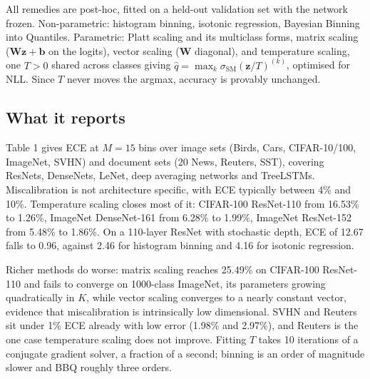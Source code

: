 All remedies are post-hoc, fitted on a held-out validation set with the network frozen. Non-parametric: histogram binning, isotonic regression, Bayesian Binning into Quantiles. Parametric: Platt scaling and its multiclass forms, matrix scaling ($\mathbf{Wz}+\mathbf{b}$ on the logits), vector scaling ($\mathbf{W}$ diagonal), and temperature scaling, one $T>0$ shared across classes giving $\hat{q}=\max_k \sigma_{\mathrm{SM}}(\mathbf{z}/T)^{(k)}$, optimised for NLL. Since $T$ never moves the argmax, accuracy is provably unchanged.

\subsection{What it reports}

Table 1 gives ECE at $M=15$ bins over image sets (Birds, Cars, CIFAR-10/100, ImageNet, SVHN) and document sets (20 News, Reuters, SST), covering ResNets, DenseNets, LeNet, deep averaging networks and TreeLSTMs. Miscalibration is not architecture specific, with ECE typically between 4\% and 10\%. Temperature scaling closes most of it: CIFAR-100 ResNet-110 from 16.53\% to 1.26\%, ImageNet DenseNet-161 from 6.28\% to 1.99\%, ImageNet ResNet-152 from 5.48\% to 1.86\%. On a 110-layer ResNet with stochastic depth, ECE of 12.67 falls to 0.96, against 2.46 for histogram binning and 4.16 for isotonic regression.

Richer methods do worse: matrix scaling reaches 25.49\% on CIFAR-100 ResNet-110 and fails to converge on 1000-class ImageNet, its parameters growing quadratically in $K$, while vector scaling converges to a nearly constant vector, evidence that miscalibration is intrinsically low dimensional. SVHN and Reuters sit under 1\% ECE already with low error (1.98\% and 2.97\%), and Reuters is the one case temperature scaling does not improve. Fitting $T$ takes 10 iterations of a conjugate gradient solver, a fraction of a second; binning is an order of magnitude slower and BBQ roughly three orders.

